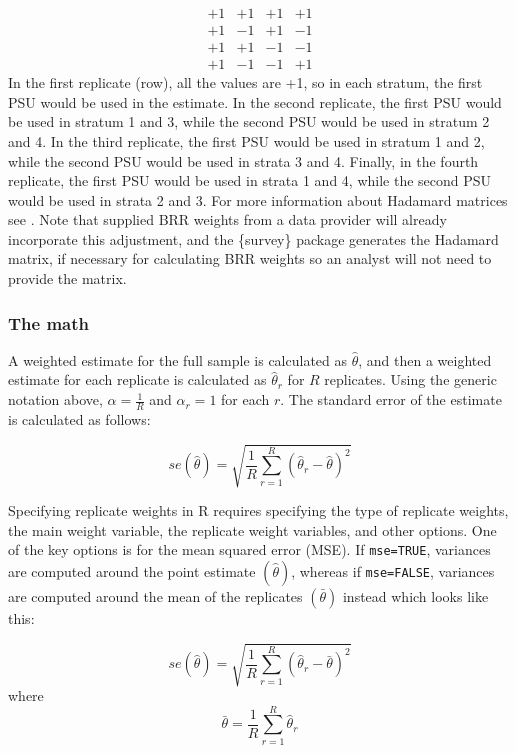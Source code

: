\documentclass[
]{krantz}
\begin{document}
\[ \begin{array}{rrrr} +1 &+1 &+1 &+1\\ +1&-1&+1&-1\\ +1&+1&-1&-1\\ +1 &-1&-1&+1 \end{array} \]
In the first replicate (row), all the values are +1, so in each stratum, the first PSU would be used in the estimate. In the second replicate, the first PSU would be used in stratum 1 and 3, while the second PSU would be used in stratum 2 and 4. In the third replicate, the first PSU would be used in stratum 1 and 2, while the second PSU would be used in strata 3 and 4. Finally, in the fourth replicate, the first PSU would be used in strata 1 and 4, while the second PSU would be used in strata 2 and 3. For more information about Hadamard matrices see \citet{wolter2007introduction}. Note that supplied BRR weights from a data provider will already incorporate this adjustment, and the \{survey\} package generates the Hadamard matrix, if necessary for calculating BRR weights so an analyst will not need to provide the matrix.

\hypertarget{the-math-4}{%
\subsubsection*{The math}\label{the-math-4}}


A weighted estimate for the full sample is calculated as \(\hat{\theta}\), and then a weighted estimate for each replicate is calculated as \(\hat{\theta}_r\) for \(R\) replicates. Using the generic notation above, \(\alpha=\frac{1}{R}\) and \(\alpha_r=1\) for each \(r\). The standard error of the estimate is calculated as follows:

\[se(\hat{\theta})=\sqrt{\frac{1}{R} \sum_{r=1}^R \left( \hat{\theta}_r-\hat{\theta}\right)^2}\]

Specifying replicate weights in R requires specifying the type of replicate weights, the main weight variable, the replicate weight variables, and other options. One of the key options is for the mean squared error (MSE). If \texttt{mse=TRUE}, variances are computed around the point estimate \((\hat{\theta})\), whereas if \texttt{mse=FALSE}, variances are computed around the mean of the replicates \((\bar{\theta})\) instead which looks like this:

\[se(\hat{\theta})=\sqrt{\frac{1}{R} \sum_{r=1}^R \left( \hat{\theta}_r-\bar{\theta}\right)^2}\] where \[\bar{\theta}=\frac{1}{R}\sum_{r=1}^R \hat{\theta}_r\]
\end{document}
